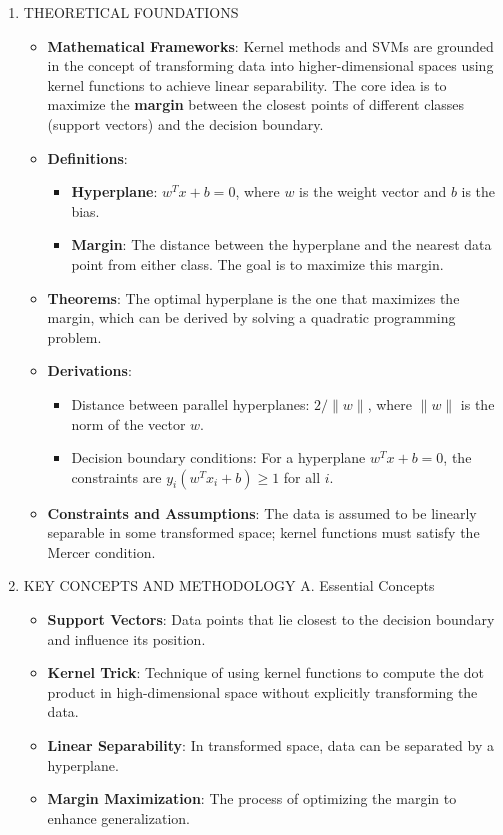 \documentclass[
  12pt,
]{report}
\providecommand{\tightlist}{%
  \setlength{\itemsep}{0pt}\setlength{\parskip}{0pt}}
\begin{document}
\begin{enumerate}
\def\labelenumi{\arabic{enumi}.}
\tightlist
\item
  THEORETICAL FOUNDATIONS

  \begin{itemize}
  \tightlist
  \item
    \textbf{Mathematical Frameworks}: Kernel methods and SVMs are grounded in the concept of transforming data into higher-dimensional spaces using kernel functions to achieve linear separability. The core idea is to maximize the \textbf{margin} between the closest points of different classes (support vectors) and the decision boundary.
  \item
    \textbf{Definitions}:

    \begin{itemize}
    \tightlist
    \item
      \textbf{Hyperplane}: \(w^T x + b = 0\), where \(w\) is the weight vector and \(b\) is the bias.
    \item
      \textbf{Margin}: The distance between the hyperplane and the nearest data point from either class. The goal is to maximize this margin.
    \end{itemize}
  \item
    \textbf{Theorems}: The optimal hyperplane is the one that maximizes the margin, which can be derived by solving a quadratic programming problem.
  \item
    \textbf{Derivations}:

    \begin{itemize}
    \tightlist
    \item
      Distance between parallel hyperplanes: \(2 / \|w\|\), where \(\|w\|\) is the norm of the vector \(w\).
    \item
      Decision boundary conditions: For a hyperplane \(w^T x + b = 0\), the constraints are \(y_i(w^T x_i + b) \geq 1\) for all \(i\).
    \end{itemize}
  \item
    \textbf{Constraints and Assumptions}: The data is assumed to be linearly separable in some transformed space; kernel functions must satisfy the Mercer condition.
  \end{itemize}
\item
  KEY CONCEPTS AND METHODOLOGY
  A. Essential Concepts

  \begin{itemize}
  \tightlist
  \item
    \textbf{Support Vectors}: Data points that lie closest to the decision boundary and influence its position.
  \item
    \textbf{Kernel Trick}: Technique of using kernel functions to compute the dot product in high-dimensional space without explicitly transforming the data.
  \item
    \textbf{Linear Separability}: In transformed space, data can be separated by a hyperplane.
  \item
    \textbf{Margin Maximization}: The process of optimizing the margin to enhance generalization.
  \end{itemize}


\end{enumerate}
\end{document}

